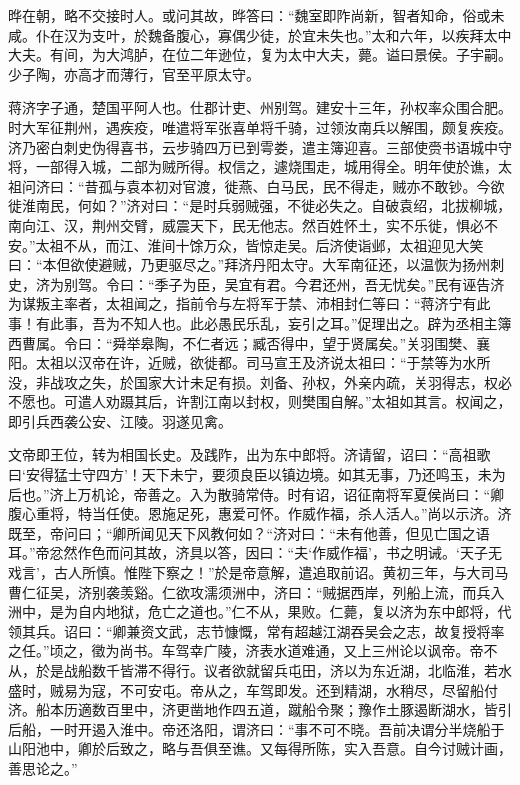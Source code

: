 \documentclass[12pt,UTF8]{ctexbook}
\begin{document}
晔在朝，略不交接时人。或问其故，晔答曰：“魏室即阼尚新，智者知命，俗或未咸。仆在汉为支叶，於魏备腹心，寡偶少徒，於宜未失也。”太和六年，以疾拜太中大夫。有间，为大鸿胪，在位二年逊位，复为太中大夫，薨。谥曰景侯。子宇嗣。少子陶，亦高才而薄行，官至平原太守。

蒋济字子通，楚国平阿人也。仕郡计吏、州别驾。建安十三年，孙权率众围合肥。时大军征荆州，遇疾疫，唯遣将军张喜单将千骑，过领汝南兵以解围，颇复疾疫。济乃密白刺史伪得喜书，云步骑四万已到雩娄，遣主簿迎喜。三部使赍书语城中守将，一部得入城，二部为贼所得。权信之，遽烧围走，城用得全。明年使於谯，太祖问济曰：“昔孤与袁本初对官渡，徙燕、白马民，民不得走，贼亦不敢钞。今欲徙淮南民，何如？”济对曰：“是时兵弱贼强，不徙必失之。自破袁绍，北拔柳城，南向江、汉，荆州交臂，威震天下，民无他志。然百姓怀土，实不乐徙，惧必不安。”太祖不从，而江、淮间十馀万众，皆惊走吴。后济使诣邺，太祖迎见大笑曰：“本但欲使避贼，乃更驱尽之。”拜济丹阳太守。大军南征还，以温恢为扬州刺史，济为别驾。令曰：“季子为臣，吴宜有君。今君还州，吾无忧矣。”民有诬告济为谋叛主率者，太祖闻之，指前令与左将军于禁、沛相封仁等曰：“蒋济宁有此事！有此事，吾为不知人也。此必愚民乐乱，妄引之耳。”促理出之。辟为丞相主簿西曹属。令曰：“舜举皋陶，不仁者远；臧否得中，望于贤属矣。”关羽围樊、襄阳。太祖以汉帝在许，近贼，欲徙都。司马宣王及济说太祖曰：“于禁等为水所没，非战攻之失，於国家大计未足有损。刘备、孙权，外亲内疏，关羽得志，权必不愿也。可遣人劝蹑其后，许割江南以封权，则樊围自解。”太祖如其言。权闻之，即引兵西袭公安、江陵。羽遂见禽。

文帝即王位，转为相国长史。及践阼，出为东中郎将。济请留，诏曰：“高祖歌曰‘安得猛士守四方’！天下未宁，要须良臣以镇边境。如其无事，乃还鸣玉，未为后也。”济上万机论，帝善之。入为散骑常侍。时有诏，诏征南将军夏侯尚曰：“卿腹心重将，特当任使。恩施足死，惠爱可怀。作威作福，杀人活人。”尚以示济。济既至，帝问曰；“卿所闻见天下风教何如？“济对曰：“未有他善，但见亡国之语耳。”帝忿然作色而问其故，济具以答，因曰：“夫‘作威作福’，书之明诫。‘天子无戏言’，古人所慎。惟陛下察之！”於是帝意解，遣追取前诏。黄初三年，与大司马曹仁征吴，济别袭羡谿。仁欲攻濡须洲中，济曰：“贼据西岸，列船上流，而兵入洲中，是为自内地狱，危亡之道也。”仁不从，果败。仁薨，复以济为东中郎将，代领其兵。诏曰：“卿兼资文武，志节慷慨，常有超越江湖吞吴会之志，故复授将率之任。”顷之，徵为尚书。车驾幸广陵，济表水道难通，又上三州论以讽帝。帝不从，於是战船数千皆滞不得行。议者欲就留兵屯田，济以为东近湖，北临淮，若水盛时，贼易为寇，不可安屯。帝从之，车驾即发。还到精湖，水稍尽，尽留船付济。船本历適数百里中，济更凿地作四五道，蹴船令聚；豫作土豚遏断湖水，皆引后船，一时开遏入淮中。帝还洛阳，谓济曰：“事不可不晓。吾前决谓分半烧船于山阳池中，卿於后致之，略与吾俱至谯。又每得所陈，实入吾意。自今讨贼计画，善思论之。”
\end{document}
